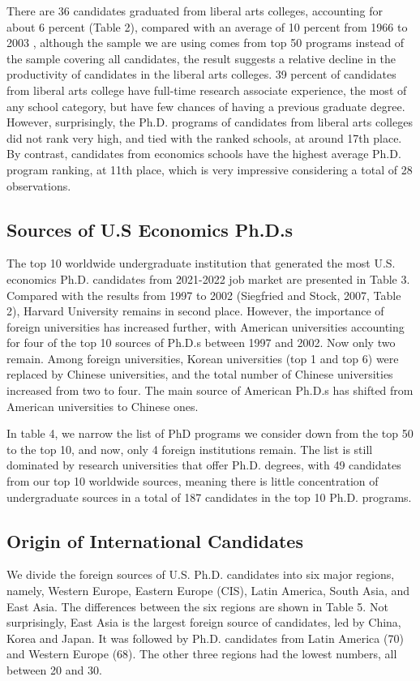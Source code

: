 \documentclass[12pt]{article}
\begin{document}
There are 36 candidates graduated from liberal arts colleges, accounting for about 6 percent (Table 2), compared with an average of 10 percent from 1966 to 2003 \citep{stock2007}, although the sample we are using comes from top 50 programs instead of the sample covering all candidates, the result suggests a relative decline in the productivity of candidates in the liberal arts colleges. 39 percent of candidates from liberal arts college have full-time research associate experience, the most of any school category, but have few chances of having a previous graduate degree. However, surprisingly, the Ph.D. programs of candidates from liberal arts colleges did not rank very high, and tied with the ranked schools, at around 17th place. By contrast, candidates from economics schools have the highest average Ph.D. program ranking, at 11th place, which is very impressive considering a total of 28 observations.

\subsection{Sources of U.S Economics Ph.D.s}
The top 10 worldwide undergraduate institution that generated the most U.S. economics Ph.D. candidates from 2021-2022 job market are presented in Table 3. Compared with the results from 1997 to 2002 (Siegfried and Stock, 2007, Table 2), Harvard University remains in second place. However, the importance of foreign universities has increased further, with American universities accounting for four of the top 10 sources of Ph.D.s between 1997 and 2002. Now only two remain. Among foreign universities, Korean universities (top 1 and top 6) were replaced by Chinese universities, and the total number of Chinese universities increased from two to four. The main source of American Ph.D.s has shifted from American universities to Chinese ones.



In table 4, we narrow the list of PhD programs we consider down from the top 50 to the top 10, and now, only 4 foreign institutions remain. The list is still dominated by research universities that offer Ph.D. degrees, with 49 candidates from our top 10 worldwide sources, meaning there is little concentration of undergraduate sources in a total of 187 candidates in the top 10 Ph.D. programs.




\subsection{Origin of International Candidates}
We divide the foreign sources of U.S. Ph.D. candidates into six major regions, namely, Western Europe, Eastern Europe (CIS), Latin America, South Asia, and East Asia. The differences between the six regions are shown in Table 5. Not surprisingly, East Asia is the largest foreign source of candidates, led by China, Korea and Japan. It was followed by Ph.D. candidates from Latin America (70) and Western Europe (68). The other three regions had the lowest numbers, all between 20 and 30.
\end{document}
